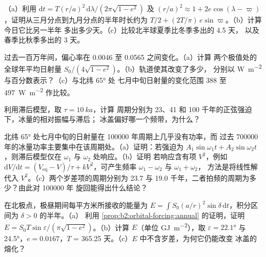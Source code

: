 \begin{exercise}[$\star\star$]\label{exo:b2:orbital-forcing:7}
（a）利用 $\mathrm dt = T(r/a)^2\,\mathrm d\lambda/(2\pi\sqrt{1 - e^2})$ 及 $(r/a)^2 \approx 1 +
2e\cos(\lambda - \varpi)$，证明从三月分点到九月分点的半年时长约为
$T/2 + (2T/\pi)\,e\sin\varpi$。（b）计算今日它比另一半年
多出多少天。（c）比较北半球夏季比冬季多出的 4.5 天，
以及春季比秋季多出的 3 天。
\end{exercise}

\begin{exercise}[$\star\star$]\label{exo:b2:orbital-forcing:8}
过去一百万年间，偏心率在 \num{0.0046} 至 \num{0.0565} 之间变化。（a）计算
两个极值处的全球年平均日射量 $S_0/(4\sqrt{1 - e^2})$。（b）轨道使其改变了多少，
分别以 \unit{W.m^{-2}} 与百分数表示？（c）与北纬 \ang{65} 处
七月中旬日射量的变化范围 388 至 \qty{497}{W.m^{-2}} 作比较。
\end{exercise}

\begin{exercise}[$\star\star$]\label{exo:b2:orbital-forcing:9}
利用滞后模型，取 $\tau = \qty{10}{ka}$，计算
周期分别为 23、41 和 \num{100} 千年的正弦强迫下，冰量的相对振幅与滞后；
冰盖偏好哪一个频带，为什么？
\end{exercise}

\begin{exercise}[$\star\star\star$]\label{exo:b2:orbital-forcing:10}
北纬 \ang{65} 处七月中旬的日射量在 \num{100000} 年周期上几乎没有功率，而
过去 \num{700000} 年的冰量功率主要集中在该周期处。（a）证明：若强迫为 $A_1\sin
\omega_1 t + A_2\sin\omega_2 t$，则滞后模型仅在 $\omega_1$ 与 $\omega_2$ 处响应。（b）证明
若响应含有项 $V^2$，例如 $\mathrm dV/\mathrm dt = (V_{\mathrm{eq}} -
V)/\tau + kV^2$，可产生频率 $\omega_1 - \omega_2$ 与 $\omega_1 + \omega_2$，
方法是将线性解代入 $V^2$。（c）两个岁差项的周期分别为 \num{23.7} 与
\num{19.0} 千年，二者拍频的周期为多少？由此对 \num{100000} 年
旋回能得出什么结论？
\end{exercise}

\begin{exercise}[$\star\star\star$]\label{exo:b2:orbital-forcing:11}
在北极点，极昼期间每平方米所接收的能量为 $E = \int S_0(a/r)^2
\sin\delta\,\mathrm dt$，积分区间为 $\delta > 0$ 的半年。（a）
利用 \cref{prop:b2:orbital-forcing:annual} 的证明，证明 $E = S_0T\sin\varepsilon/(\pi\sqrt{1 - e^2})$。（b）计算
$E$（单位 \unit{GJ.m^{-2}}），取 $\varepsilon = \ang{22.1}$ 与 \ang{24.5}，$e = 0.0167$，$T$ =
365.25 天。（c）$E$ 中不含岁差，为何它仍能改变
冰盖的熔化？
\end{exercise}

